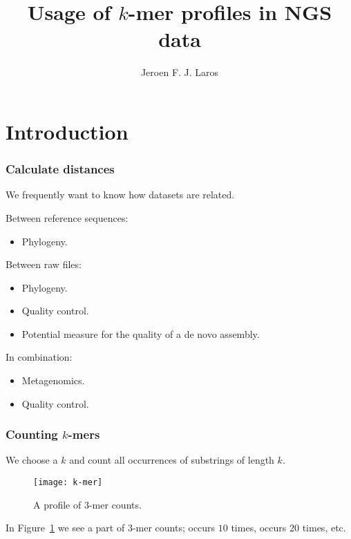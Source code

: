 \documentclass[slidestop]{beamer}
\title{Usage of $k$-mer profiles in NGS data}
\author{Jeroen F. J. Laros}
\begin{document}

\bodytemplate

\section{Introduction}
\begin{frame}
  \frametitle{Calculate distances}

  We frequently want to know how datasets are related.
  \bigskip
  \pause

  Between reference sequences:
  \begin{itemize}
    \item Phylogeny.
  \end{itemize}
  \bigskip
  \pause

  Between raw files:
  \begin{itemize}
    \item Phylogeny.
    \item Quality control.
    \item Potential measure for the quality of a de novo assembly.
  \end{itemize}
  \bigskip
  \pause

  In combination:
  \begin{itemize}
    \item Metagenomics.
    \item Quality control.
  \end{itemize}
\end{frame}

\begin{frame}
  \frametitle{Counting $k$-mers}

  We choose a $k$ and count all occurrences of substrings of length $k$.
  \pause

  \begin{figure}
    \colorbox{white}{
      \texttt{[image: k-mer]}
    }
    \vspace{-0.5cm}
    \caption{A profile of $3$-mer counts.} \label{fig:kmerprofile}
  \end{figure}

  In Figure~\ref{fig:kmerprofile} we see a part of $3$-mer counts; 
  occurs $10$ times,  occurs 20 times, etc.
\end{frame}
\end{document}
